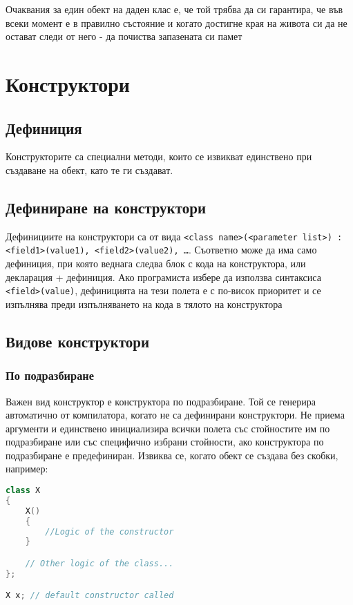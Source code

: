\documentclass[fleqn,12pt]{article}
\begin{document}
Очаквания за един обект на даден клас е, че той трябва да си гарантира, че във всеки момент е в правилно състояние и когато достигне края на живота си да не остават следи от него - да почиства запазената си памет


\section{Конструктори}
\subsection{Дефиниция}
Конструкторите са специални методи, които се извикват единствено при създаване на обект, като те ги създават.

\subsection{Дефиниране на конструктори}
Дефинициите на конструктори са от вида \texttt{<class name>(<parameter list>) : <field1>(value1), <field2>(value2), \dots}.
\bigbreak
Съответно може да има само дефиниция, при която веднага следва блок с кода на конструктора,
или декларация + дефиниция. Ако програмиста избере да използва синтаксиса \texttt{<field>(value)}, дефиницията на тези полета е с по-висок приоритет и се изпълнява преди изпълняването на кода в тялото на конструктора 

\subsection{Видове конструктори}
\subsubsection{По подразбиране}
Важен вид конструктор е конструктора по подразбиране. Той се генерира автоматично от компилатора, 
когато не са дефинирани конструктори. Не приема аргументи и единствено инициализира всички полета със стойностите им по подразбиране или със специфично избрани стойности, ако конструктора по подразбиране е предефиниран.
Извиква се, когато обект се създава без скобки, например:
\begin{lstlisting}[language=C++, caption=Default constructor]
class X
{
    X()
    {
        //Logic of the constructor
    }

    // Other logic of the class...
};

X x; // default constructor called
\end{lstlisting}
\end{document}
